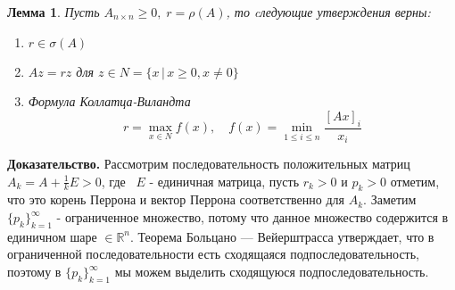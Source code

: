 \documentclass[a4paper,12pt,leqno]{article} %
\newtheorem{lemma}[theorem]{Лемма}
\begin{document}
    \begin{lemma}
        Пусть $A_{n \times n} \geq 0, \; r = \rho(A)$, то cледующие утверждения верны:
        \begin{enumerate}
            \item $r \in \sigma(A)$
            \item $Az = rz$ для $z \in N = \{x \, | \, x \geq 0, x \neq 0\}$
            \item Формула Коллатца-Виландта
            \begin{equation*}
                r = \max_{x \in N} f(x), \quad  f(x) = \min_{1 \leq i \leq n}\frac{[Ax]_{i}}{x_i}
            \end{equation*}
        \end{enumerate}
    \end{lemma}
    \textbf{Доказательство.} Рассмотрим последовательность положительных матриц 
    $A_k = A + \frac{1}{k}E > 0$, где  $E$ - единичная матрица, пусть $r_k > 0$ и $p_k > 0$
    отметим, что это корень Перрона и вектор Перрона соответственно для $A_k$.
    Заметим $\{p_k\}^{\infty}_{k = 1}$ - ограниченное множество, потому что 
    данное множество содержится в единичном шаре $\in \mathbb{R}^n$.
    Теорема Больцано — Вейерштрасса утверждает, что
    в ограниченной последовательности есть сходящаяся подпоследовательность, 
    поэтому в $\{p_k\}^{\infty}_{k = 1}$ мы 
    можем выделить сходящуюся подпоследовательность.
     
\end{document}

